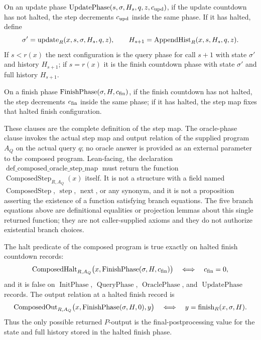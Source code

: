 \begin{definition}
  On an update phase
  $\operatorname{UpdatePhase}(s,\sigma,H_s,q,z,c_{\rm upd})$, if the update
  countdown has not halted, the step decrements $c_{\rm upd}$ inside the same
  phase.  If it has halted, define
  \[
    \sigma'=\operatorname{update}_R(x,s,\sigma,H_s,q,z),
    \qquad
    H_{s+1}=\operatorname{AppendHist}_R(x,s,H_s,q,z).
  \]
  If $s<r(x)$ the next configuration is the query phase for call $s+1$ with
  state $\sigma'$ and history $H_{s+1}$; if $s=r(x)$ it is the finish countdown
  phase with state $\sigma'$ and full history $H_{s+1}$.

  On a finish phase
  $\operatorname{FinishPhase}(\sigma,H,c_{\rm fin})$, if the finish countdown
  has not halted, the step decrements $c_{\rm fin}$ inside the same phase; if
  it has halted, the step map fixes that halted finish configuration.

  These clauses are the complete definition of the step map.  The oracle-phase
  clause invokes the actual step map and output relation of the supplied
  program $A_Q$ on the actual query $q$; no oracle answer is provided as an
  external parameter to the composed program.  Lean-facing, the declaration
  $\operatorname{def\_composed\_oracle\_step\_map}$ must return the function
  $\operatorname{ComposedStep}_{R,A_Q}(x)$ itself.  It is not a structure with
  a field named $\operatorname{ComposedStep}$, $\operatorname{step}$,
  $\operatorname{next}$, or any synonym, and it is not a proposition asserting
  the existence of a function satisfying branch equations.  The five branch
  equations above are definitional equalities or projection lemmas about this
  single returned function; they are not caller-supplied axioms and they do not
  authorize existential branch choices.
\end{definition}

\begin{definition}
  \label{def:composed-oracle-halt-output}
  The halt predicate of the composed program is true exactly on halted finish
  countdown records:
  \[
    \operatorname{ComposedHalt}_{R,A_Q}
      \bigl(x,\operatorname{FinishPhase}(\sigma,H,c_{\rm fin})\bigr)
    \quad\Longleftrightarrow\quad
    c_{\rm fin}=0,
  \]
  and it is false on $\operatorname{InitPhase}$, $\operatorname{QueryPhase}$,
  $\operatorname{OraclePhase}$, and $\operatorname{UpdatePhase}$ records.
  The output relation at a halted finish record is
  \[
    \operatorname{ComposedOut}_{R,A_Q}
      \bigl(x,\operatorname{FinishPhase}(\sigma,H,0),y\bigr)
    \quad\Longleftrightarrow\quad
    y=\operatorname{finish}_R(x,\sigma,H).
  \]
  Thus the only possible returned $P$-output is the final-postprocessing value
  for the state and full history stored in the halted finish phase.
\end{definition}

